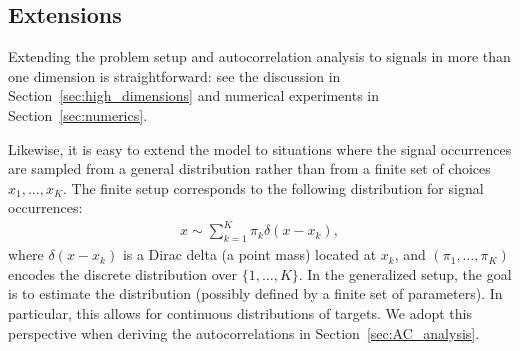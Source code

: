 \documentclass[12pt]{article}
\newcommand{\1}{\mathbf{1}}
\newcommand{\TODO}[1]{{\color{red}{[#1]}}}
\theoremstyle{plain}
\theoremstyle{definition}
\theoremstyle{remark}
\theoremstyle{plain}
\theoremstyle{remark}
\theoremstyle{plain}
\theoremstyle{plain}
\theoremstyle{plain}
\numberwithin{equation}{section}
\begin{document}
%
%

 
 
 
\subsection*{Extensions} \label{sec:extensions}

Extending the problem setup and autocorrelation analysis to signals in more than one dimension is straightforward: see the discussion in Section~\ref{sec:high_dimensions} and numerical experiments in Section~\ref{sec:numerics}.

Likewise, it is easy to extend the model to situations where the signal occurrences are sampled from a general distribution rather than from a finite set of choices $x_1, \ldots, x_K$. The finite setup corresponds to the following distribution for signal occurrences:
\begin{align}
	x \sim \sum_{k=1}^K \pi_k \delta(x - x_k),
	\label{eq:heterogeneousdistribution}
\end{align}
where $\delta(x - x_k)$ is a Dirac delta (a point mass) located at $x_k$, and $(\pi_1, \ldots, \pi_K)$ encodes the discrete distribution over $\{1, \ldots, K\}$.
In the generalized setup, the goal is to estimate the distribution (possibly defined by a finite set of parameters). In particular, this allows for continuous distributions of targets. We adopt this perspective when deriving the autocorrelations in Section~\ref{sec:AC_analysis}.
\end{document}
